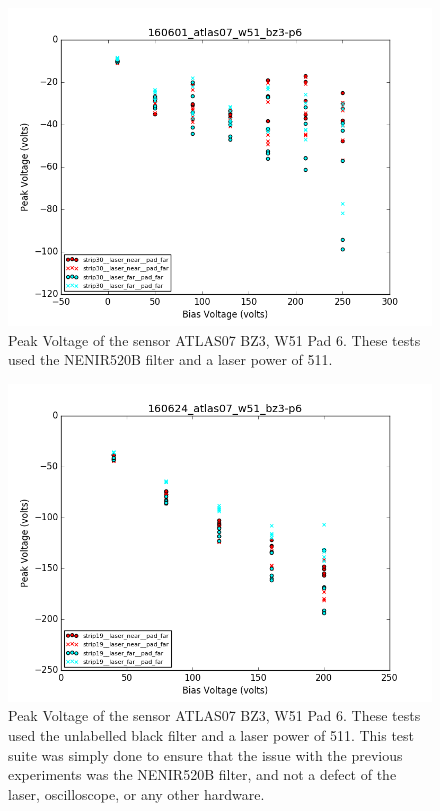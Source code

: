 \documentclass{report}
\begin{document}
            \begin{figure}[h] 
                \includegraphics[height=.4\textheight]{160601_atlas07_w51_bz3-p6}
                \centering
                \caption{ Peak Voltage of the sensor ATLAS07 BZ3, W51 Pad 6. These tests used the NENIR520B filter and a laser power of 511. }
                \label{fig:160601_atlas07_w51_bz3-p6}
            \end{figure}

            \begin{figure}[h] 
                \includegraphics[height=.4\textheight]{160624_atlas07_w51_bz3-p6}
                \centering
                \caption{ Peak Voltage of the sensor ATLAS07 BZ3, W51 Pad 6. These tests used the unlabelled black filter and a laser power of 511. This test suite was simply done to ensure that the issue with the previous experiments was the NENIR520B filter, and not a defect of the laser, oscilloscope, or any other hardware. }
                \label{fig:160624_atlas07_w51_bz3-p6}
            \end{figure}
\end{document}
